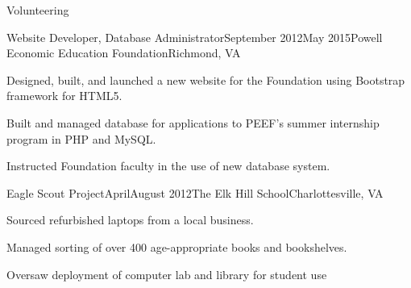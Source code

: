 \documentclass{resume} %
\begin{document}
\begin{rSection}{Volunteering}

\begin{rSubsection}{Website Developer, Database Administrator}{September 2012\textminus May 2015}{Powell Economic Education Foundation}{Richmond, VA}
\item[] Designed, built, and launched a new website for the Foundation using Bootstrap framework for HTML5.
\item[] Built and managed database for applications to PEEF's summer internship program in PHP and MySQL.
\item[] Instructed Foundation faculty in the use of new database system.
\end{rSubsection}
\begin{rSubsection}{Eagle Scout Project}{April\textminus August 2012}{The Elk Hill School}{Charlottesville, VA}
\item[] Sourced refurbished laptops from a local business.
\item[] Managed sorting of over 400 age-appropriate books and bookshelves.
\item[] Oversaw deployment of computer lab and library for student use
\end{rSubsection}
\end{rSection}











\end{document}
